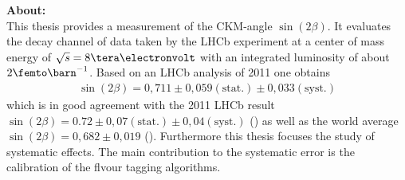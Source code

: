 \begin{titlepage}
\vfill

\Large\textbf{About:} \\
\normalsize
This thesis provides a measurement of the CKM-angle $\sin(2\beta)$. It evaluates the decay channel \Decaychannel of data taken by the LHCb experiment at a center of mass energy of $\sqrt{s}=8\tera\electronvolt$ with an integrated luminosity of about $2\femto\barn^{-1}$. Based on an LHCb analysis of 2011 one obtains
\begin{align*}
\sin(2\beta) = 0,711 \pm 0,059(\text{stat.}) \pm 0,033(\text{syst.})
\end{align*}
which is in good agreement with the 2011 LHCb result $\sin(2\beta) = 0.72 \pm 0,07 (\text{stat.}) \pm 0,04 (\text{syst.})$ (\cite{lhcb-paper}) as well as the world average $\sin(2\beta) = 0,682 \pm 0,019$ (\cite{pdg-average}). Furthermore this thesis focuses the study of systematic effects. The main contribution to the systematic error is the calibration of the flvour tagging algorithms.



\end{titlepage}
